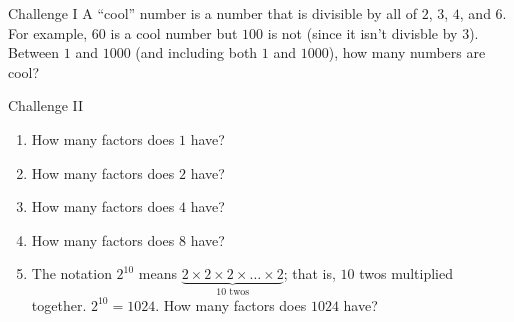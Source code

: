 \documentclass[12pt,letterpaper]{article}
\begin{document}
\begin{problem}{Challenge I}
 A ``cool'' number is a number that is divisible by all of $2$, $3$, $4$, and
 $6$. For example, $60$ is a cool number but $100$ is not (since it isn't
 divisble by $3$). Between $1$ and $1000$ (and including both $1$ and $1000$),
 how many numbers are cool?
\end{problem}

\begin{problem}{Challenge II}
 \begin{enumerate}
  \item How many factors does $1$ have?
  \item How many factors does $2$ have?
  \item How many factors does $4$ have?
  \item How many factors does $8$ have?
  \item The notation $2^{10}$ means $\underbrace{ 2\times2\times2\times
  \ldots\times2}_\text{$10$ twos}$; that is, $10$ twos multiplied together.
  $2^{10}=1024$. How many factors does $1024$ have?
 \end{enumerate}

\end{problem}
\end{document}
